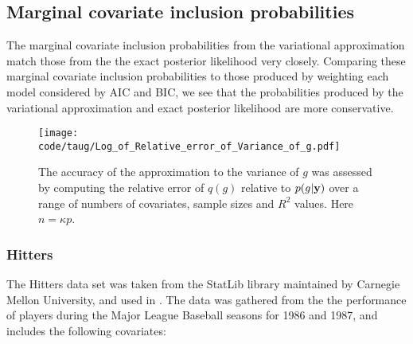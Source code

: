 \documentclass{amsart}[12pt]
\begin{document}
\subsection{Marginal covariate inclusion probabilities}

The marginal covariate inclusion probabilities from the variational approximation match those from the the
exact posterior likelihood very closely. Comparing these marginal covariate inclusion probabilities to those
produced by weighting each model considered by AIC and BIC, we see that the probabilities produced by the
variational approximation and exact posterior likelihood are more conservative.

\begin{figure}[p]
	\texttt{[image: code/taug/Log\_of\_Relative\_error\_of\_Variance\_of\_g.pdf]}
	\caption{The accuracy of the approximation to the variance of $g$ was assessed by computing the relative
		error of $q(g)$ relative to $p(g | {\bf y})$ over a range
		of numbers of covariates, sample sizes and $R^2$  values. Here $n = \kappa p$.}
	\label{fig:rel_error_var_g}
\end{figure}





\subsubsection{Hitters}

The Hitters data set was taken from the StatLib library maintained by Carnegie Mellon University, and used in
\cite{James:2014:ISL:2517747}. The data was gathered from the the performance of players during the Major
League Baseball seasons for 1986 and 1987, and includes the following covariates:
\end{document}
